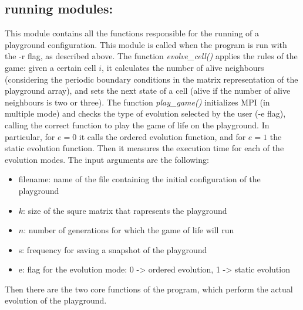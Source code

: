 \documentclass[12pt, titlepage]{report}
\begin{document}
\subsection{running modules:}
This module contains all the functions responsible for the running of a playground configuration. This module is called when the program is run with 
the -r flag, as described above. 
The function \emph{evolve\_cell()} applies the rules of the game: given a certain cell $i$, it calculates the number of alive neighbours (considering the 
periodic boundary conditions in the matrix representation of the playground array), and sets the next state of a cell (alive if the number of alive neighbours
is two or three). 
The function \emph{play\_game()} initializes MPI (in multiple mode) and checks the type of evolution selected by the user (-e flag), calling the correct function to play the game of life on the playground.
In particular, for $e=0$ it calls the ordered evolution function, and for $e=1$ the static evolution function. Then it measures the execution time for each of 
the evolution modes. The input arguments are the following:
\begin{itemize}
	\item filename: name of the file containing the initial configuration of the playground
	\item $k$: size of the squre matrix that rapresents the playground
	\item $n$: number of generations for which the game of life will run
	\item s: frequency for saving a snapshot of the playground
	\item e: flag for the evolution mode: 0 -> ordered evolution, 1 -> static evolution
\end{itemize}
Then there are the two core functions of the program, which perform the actual evolution of the playground.
\end{document}
